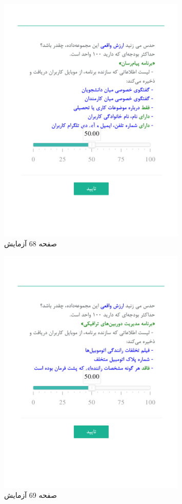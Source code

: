 { 
\begin{figure}[htpb]
\centering
\includegraphics[width=0.8\textwidth]{./img/Task68.png/}
\caption{ صفحه 68 آزمایش }
\label{fig:Task68}
\end{figure}
 
 
\begin{figure}[htpb]
\centering
\includegraphics[width=0.8\textwidth]{./img/Task69.png/}
\caption{ صفحه 69 آزمایش }
\label{fig:Task69}
\end{figure}
 
}
